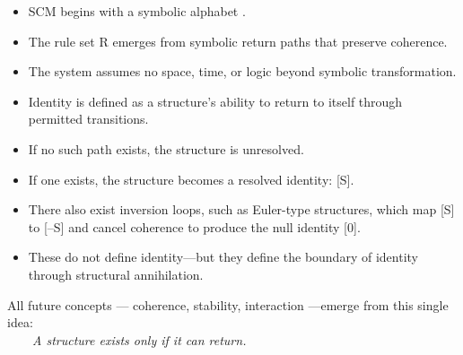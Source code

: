 \begin{itemize}
\item
  SCM begins with a symbolic alphabet \Sigma.
\item
  The rule set R emerges from symbolic return paths that preserve
  coherence.
\item
  The system assumes no space, time, or logic beyond symbolic
  transformation.
\item
  Identity is defined as a structure's ability to return to itself
  through permitted transitions.
\item
  If no such path exists, the structure is unresolved.
\item
  If one exists, the structure becomes a resolved identity: {[}S{]}.
\item
  There also exist inversion loops, such as Euler-type structures, which
  map {[}S{]} to {[}--S{]} and cancel coherence to produce the null
  identity {[}0{]}.
\item
  These do not define identity---but they define the boundary of
  identity through structural annihilation.
\end{itemize}

All future concepts --- coherence, stability, interaction ---emerge from
this single idea:\\
  \emph{A structure exists only if it can return.}